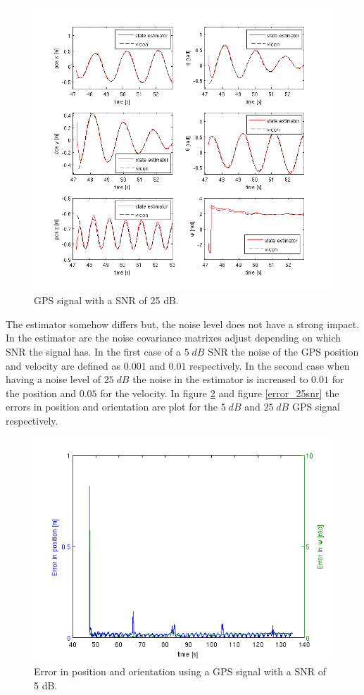 \begin{figure}[h]
\centering
\includegraphics[width=1\textwidth]{pictures/2_2_SNR25_detail_GPS.png}
\caption{GPS signal with a SNR of 25 dB.}
\label{detail_25snr}
\end{figure}
The estimator somehow differs but, the noise level does not have a strong impact. In the estimator are the noise covariance matrixes adjust depending on which SNR the signal has. In the first case of a $5\; dB$ SNR the noise of the GPS position and velocity are defined as $0.001$ and $0.01$ respectively. In the second case when having a noise level of $25\; dB$ the noise in the estimator is increased to $0.01$ for the position and $0.05$ for the velocity.
In figure \ref{error_5snr} and figure \ref{error_25snr} the errors in position and orientation are plot for the $5\; dB$ and $25\; dB$ GPS signal respectively. 
\begin{figure}[h]
\centering
\includegraphics[width=1\textwidth]{pictures/2_2_SNR5_errors_GPS.png}
\caption{Error in position and orientation using a GPS signal with a SNR of 5 dB.}
\label{error_5snr}
\end{figure}
